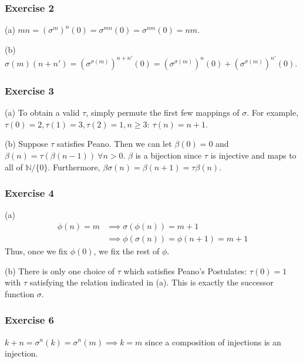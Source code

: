 \subsubsection{Exercise 2}
(a) $mn = (\sigma^m)^n (0) = \sigma^{mn} (0) = \sigma^{nm} (0) = nm$.

(b) $\sigma(m) (n + n') = (\sigma^{\sigma(m)})^{n + n'}(0) = (\sigma^{\sigma(m)})^n(0) + (\sigma^{\sigma(m)})^{n'}(0)$.

\subsubsection{Exercise 3}
(a) To obtain a valid $\tau$, simply permute the first few mappings of $\sigma$.
For example, $\tau(0) = 2, \tau(1) = 3, \tau(2) = 1, n \geq 3 : \: \tau(n) = n + 1$.

(b) Suppose $\tau$ satisfies Peano. Then we can let $\beta(0) = 0$ and 
$\beta(n) = \tau(\beta(n - 1))  \: \forall n > 0$. $\beta$ is a bijection since
$\tau$ is injective and maps to all of $\mathbb{N} / \{0\}$.
Furthermore, $\beta \sigma (n) = \beta (n+1) = \tau \beta (n)$.

\subsubsection{Exercise 4}
(a)
\begin{align*}
        \phi(n) = m &\implies \sigma(\phi(n)) = m + 1 \\
                    &\implies \phi(\sigma(n)) = \phi(n + 1) = m + 1
\end{align*}
Thus, once we fix $\phi(0)$, we fix the rest of $\phi$.

(b) There is only one choice of $\tau$ which satisfies Peano's Postulates:
$\tau(0) = 1$ with $\tau$ satisfying the relation indicated in (a). 
This is exactly the successor function $\sigma$.

\subsubsection{Exercise 6}
$k + n = \sigma^n(k) = \sigma^n(m) \implies k = m$ since a composition of injections
is an injection.
